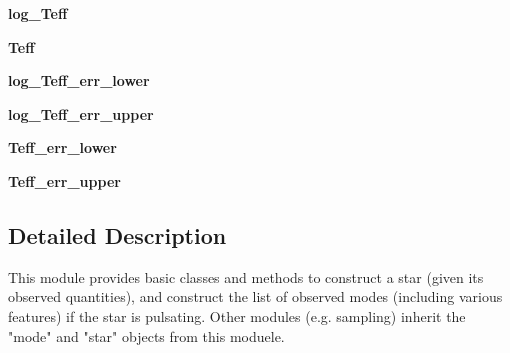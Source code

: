 \begin{DoxyCompactItemize}
\mbox{\label{namespaceasamba_1_1star_a8611449c4d4b12ecd08d8c2006b199c1}} 
{\bfseries log\+\_\+\+Teff}
\item 
\mbox{\label{namespaceasamba_1_1star_ac0a4dd6a2a9e6b351483ac8b7435a00b}} 
{\bfseries Teff}
\item 
\mbox{\label{namespaceasamba_1_1star_ab37c945fb1db9c74e76fa67f8138a686}} 
{\bfseries log\+\_\+\+Teff\+\_\+err\+\_\+lower}
\item 
\mbox{\label{namespaceasamba_1_1star_a2d4353f8f856f0d2e5a6994f92147960}} 
{\bfseries log\+\_\+\+Teff\+\_\+err\+\_\+upper}
\item 
\mbox{\label{namespaceasamba_1_1star_a80e236c8c8b2cfd61fc7f3158a4ae6c9}} 
{\bfseries Teff\+\_\+err\+\_\+lower}
\item 
\mbox{\label{namespaceasamba_1_1star_ae699b4859f9d08fcad534007f451f334}} 
{\bfseries Teff\+\_\+err\+\_\+upper}
\end{DoxyCompactItemize}


\subsection{Detailed Description}
\begin{DoxyVerb}This module provides basic classes and methods to construct a star (given its observed quantities), 
and construct the list of observed modes (including various features) if the star is pulsating. Other
modules (e.g. sampling) inherit the "mode" and "star" objects from this moduele.
\end{DoxyVerb}
 
